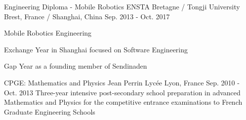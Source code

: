 

\begin{cventries}

	\cventry
	{Engineering Diploma - Mobile Robotics} %
	{ENSTA Bretagne / Tongji University} %
	{Brest, France / Shanghai, China} %
	{Sep. 2013 - Oct. 2017} %
	{
		\begin{cvitems} %
			\item {Mobile Robotics Engineering}
			\item {Exchange Year in Shanghai focused on Software Engineering}
			\item {Gap Year as a founding member of Sendinaden}
		\end{cvitems}
	}

	\cventry
	{CPGE: Mathematics and Physics} %
	{Jean Perrin Lyc\'ee } %
	{Lyon, France} %
	{Sep. 2010 - Oct. 2013} %
	{
		Three-year intensive post-secondary school preparation in advanced Mathematics and Physics for
		the competitive entrance examinations to French Graduate Engineering Schools
	}

\end{cventries}
